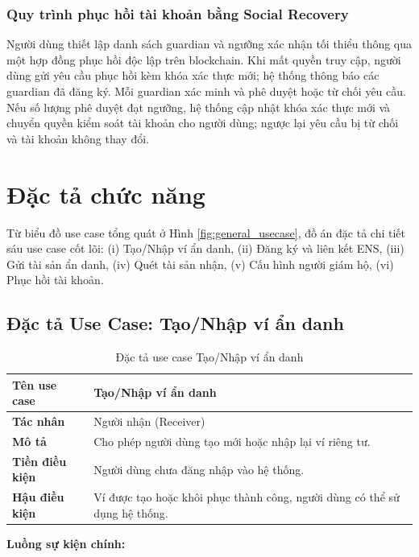 \documentclass[../DoAn.tex]{subfiles}
\begin{document}
\subsubsection{Quy trình phục hồi tài khoản bằng Social Recovery}

Người dùng thiết lập danh sách guardian và ngưỡng xác nhận tối thiểu thông qua một hợp đồng phục hồi độc lập trên blockchain. Khi mất quyền truy cập, người dùng gửi yêu cầu phục hồi kèm khóa xác thực mới; hệ thống thông báo các guardian đã đăng ký. Mỗi guardian xác minh và phê duyệt hoặc từ chối yêu cầu. Nếu số lượng phê duyệt đạt ngưỡng, hệ thống cập nhật khóa xác thực mới và chuyển quyền kiểm soát tài khoản cho người dùng; ngược lại yêu cầu bị từ chối và tài khoản không thay đổi.


\section{Đặc tả chức năng}
\label{section:2.3}

Từ biểu đồ use case tổng quát ở Hình \ref{fig:general_usecase}, đồ án đặc tả chi tiết sáu use case cốt lõi: (i) Tạo/Nhập ví ẩn danh, (ii) Đăng ký và liên kết ENS, (iii) Gửi tài sản ẩn danh, (iv) Quét tài sản nhận, (v) Cấu hình người giám hộ, (vi) Phục hồi tài khoản.

\subsection{Đặc tả Use Case: Tạo/Nhập ví ẩn danh}

\begin{table}[H]
\centering
\caption{Đặc tả use case Tạo/Nhập ví ẩn danh}
\begin{tabular}{|p{4cm}|p{10cm}|}
\hline
\textbf{Tên use case} & Tạo/Nhập ví ẩn danh \\ \hline
\textbf{Tác nhân} & Người nhận (Receiver) \\ \hline
\textbf{Mô tả} & Cho phép người dùng tạo mới hoặc nhập lại ví riêng tư. \\ \hline
\textbf{Tiền điều kiện} & Người dùng chưa đăng nhập vào hệ thống. \\ \hline
\textbf{Hậu điều kiện} & Ví được tạo hoặc khôi phục thành công, người dùng có thể sử dụng hệ thống. \\ \hline
\end{tabular}
\end{table}

\textbf{Luồng sự kiện chính:}
\end{document}
